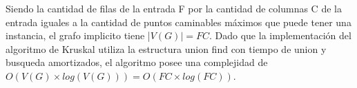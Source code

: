 Siendo la cantidad de filas de la entrada F por la cantidad de columnas C de la entrada iguales a la cantidad de puntos caminables máximos que puede tener una instancia, el grafo implicito tiene |$V(G)| = FC $. Dado que la implementación del algoritmo de Kruskal utiliza la estructura union find con tiempo de union y busqueda amortizados, el algoritmo posee una complejidad de $O(V(G)\times log(V(G))) = O(FC \times log(FC)) $. 